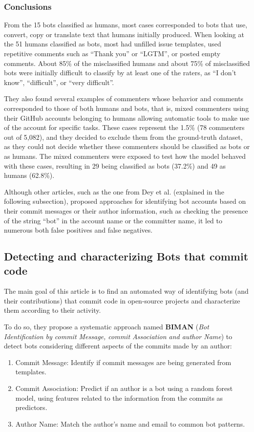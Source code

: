 \documentclass[a4paper, 12pt]{book}
\begin{document}
\subsubsection{Conclusions}
\label{sssec:golzadeh-conclusions}

From the 15 bots classified as humans, most cases corresponded to bots that use, convert, copy or translate text that humans initially produced. When looking at the 51 humans classified as bots, most had unfilled issue templates, used repetitive comments such as ``Thank you'' or ``LGTM'', or posted empty comments. About 85\% of the misclassified humans and about 75\% of misclassified bots were initially difficult to classify by at least one of the raters, as ``I don't know'', ``difficult'', or ``very difficult''.

They also found several examples of commenters whose behavior and comments corresponded to those of both humans and bots, that is, mixed commenters using their GitHub accounts belonging to humans allowing automatic tools to make use of the account for specific tasks. These cases represent the 1.5\% (78 commenters out of 5,082), and they decided to exclude them from the ground-truth dataset, as they could not decide whether these commenters should be classified as bots or as humans. The mixed commenters were exposed to test how the model behaved with these cases, resulting in 29 being classified as bots (37.2\%) and 49 as humans (62.8\%). 

Although other articles, such as the one from Dey et al. (explained in the following subsection), proposed approaches for identifying bot accounts based on their commit messages or their author information, such as checking the presence of the string ``bot'' in the account name or the committer name, it led to numerous both false positives and false negatives.

\subsection{Detecting  and characterizing Bots that commit code}
\label{ssec:dey}

The main goal of this article is to find an automated way of identifying bots (and their contributions) that commit code in open-source projects and characterize them according to their activity.

To do so, they propose a systematic approach named \textbf{BIMAN} (\emph{Bot Identification by commit Message, commit Association and author Name}) to detect bots considering different aspects of the commits made by an author:
\begin{enumerate}
    \item Commit Message: Identify if commit messages are being generated from templates.
    \item Commit Association: Predict if an author is a bot using a random forest model, using features related to the information from the commits as predictors.
    \item Author Name: Match the author's name and email to common bot patterns.
\end{enumerate}
\end{document}
